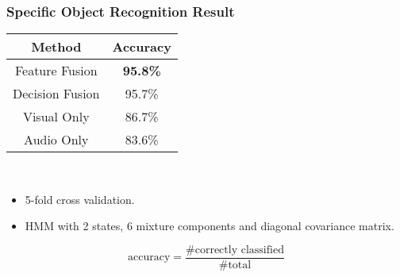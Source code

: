 \documentclass{beamer}
\begin{document}
  \begin{frame}
    \frametitle{Specific Object Recognition Result}

    \centering
    \begin{tabular}[h]{c|c}
      \hline
      Method & Accuracy \\ \hline \hline
      Feature Fusion & \textbf{95.8\%} \\ \hline
      Decision Fusion  & 95.7\% \\ \hline
      Visual Only & 86.7\% \\ \hline
      Audio Only & 83.6\% \\ \hline
    \end{tabular}

    ~
    \begin{itemize}
      \item 5-fold cross validation.
      \item HMM with 2 states, 6 mixture components and diagonal covariance matrix.
    \end{itemize}
    \vfill
    {\scriptsize
      \[ \text{accuracy} =  \frac{\text{\# correctly classified}}{\text{\# total}} \]
    }
  \end{frame}

  \iffalse
  \begin{frame}
    \frametitle{Generic Category Recognition Result}

    \begin{columns}
      \begin{column}{.5\linewidth}
        \centering
        \scriptsize
        \texttt{[image: roc.tikz]}
      \end{column}
      \begin{column}{.5\linewidth}
        \begin{itemize}
          \item Object-based cross validation.
          \item Receiver operating characteristic (ROC).
          \item Area under the curve (AUC).
            \begin{itemize}
              \item 0.5 => Random
              \item 1.0 => Perfect 
            \end{itemize}
        \end{itemize}
      \end{column}
    \end{columns}
    {\scriptsize
      \[ \text{true positive rate} =  \frac{\text{\# true positive}}{\text{\# conditional positive}} \]
      \[ \text{false positive rate} =  \frac{\text{\# false positive}}{\text{\# conditional negative}} \]
    }
  \end{frame}
  \fi
\end{document}
